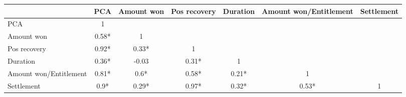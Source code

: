 \begin{tabular}{l|cccccc}
\toprule
\multicolumn{1}{r}{} & \multicolumn{1}{l}{PCA} & \multicolumn{1}{l}{Amount won} & \multicolumn{1}{l}{Pos recovery} & \multicolumn{1}{l}{Duration} & \multicolumn{1}{l}{Amount won/Entitlement } & \multicolumn{1}{l}{Settlement} \\
\midrule
\midrule
PCA   & 1     &       &       &       &       &  \\
Amount won & 0.58* & 1     &       &       &       &  \\
Pos recovery & 0.92* & 0.33* & 1     &       &       &  \\
Duration & 0.36* & -0.03 & 0.31* & 1     &       &  \\
Amount won/Entitlement  & 0.81* & 0.6*  & 0.58* & 0.21* & 1     &  \\
Settlement & 0.9*  & 0.29* & 0.97* & 0.32* & 0.53* & 1 \\
\bottomrule
\bottomrule
\end{tabular}%
